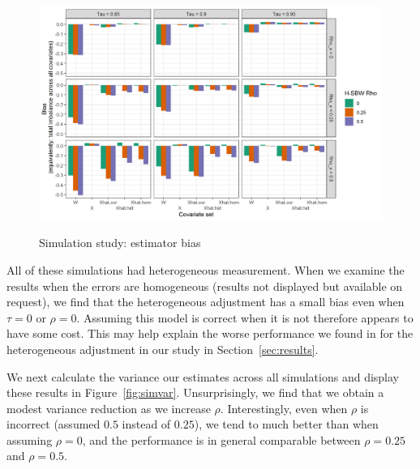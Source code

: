 \begin{figure}[H]
\begin{center}
    \caption{Simulation study: estimator bias}\label{fig:simbias}
    \label{fig:loveplotc1}
    \includegraphics[scale=0.5]{01_Plots/bias-plot.png}
\end{center}
\end{figure}

All of these simulations had heterogeneous measurement. When we examine the results when the errors are homogeneous (results not displayed but available on request), we find that the heterogeneous adjustment has a small bias even when $\tau = 0$ or $\rho = 0$. Assuming this model is correct when it is not therefore appears to have some cost. This may help explain the worse performance we found in for the heterogeneous adjustment in our study in Section~\ref{sec:results}.

We next calculate the variance our estimates across all simulations and display these results in Figure~\ref{fig:simvar}. Unsurprisingly, we find that we obtain a modest variance reduction as we increase $\rho$. Interestingly, even when $\rho$ is incorrect (assumed $0.5$ instead of $0.25$), we tend to much better than when assuming $\rho = 0$, and the performance is in general comparable between $\rho = 0.25$ and $\rho = 0.5$.


